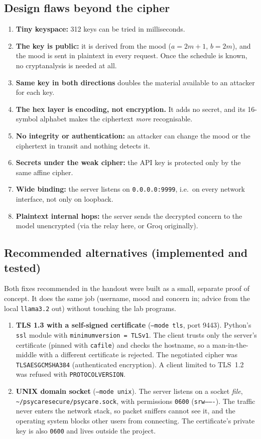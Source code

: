 \documentclass[11pt,a4paper]{article}
\DeclareRobustCommand{\_}{\textunderscore\allowbreak}  %
\newcommand{\ct}[1]{\texttt{#1}}
\begin{document}
\subsection{Design flaws beyond the cipher}
\begin{enumerate}
\item \textbf{Tiny keyspace:} 312 keys can be tried in milliseconds.
\item \textbf{The key is public:} it is derived from the mood ($a=2m+1$, $b=2m$), and the mood is sent in plaintext
      in every request. Once the schedule is known, no cryptanalysis is needed at all.
\item \textbf{Same key in both directions} doubles the material available to an attacker for each key.
\item \textbf{The hex layer is encoding, not encryption.} It adds no secret, and its 16-symbol alphabet makes the
      ciphertext \emph{more} recognisable.
\item \textbf{No integrity or authentication:} an attacker can change the mood or the ciphertext in transit and
      nothing detects it.
\item \textbf{Secrets under the weak cipher:} the API key is protected only by the same affine cipher.
\item \textbf{Wide binding:} the server listens on \ct{0.0.0.0:9999}, i.e.\ on every network interface, not only on
      loopback.
\item \textbf{Plaintext internal hops:} the server sends the decrypted concern to the model unencrypted (via the relay
      here, or Groq originally).
\end{enumerate}

\subsection{Recommended alternatives (implemented and tested)}
\label{sec:fixes}
Both fixes recommended in the handout were built as a small, separate proof of concept. It does
the same job (username, mood and concern in; advice from the local \ct{llama3.2} out) without touching the lab
programs.

\begin{enumerate}
\item \textbf{TLS 1.3 with a self-signed certificate} (\ct{--mode tls}, port 9443). Python's \ct{ssl} module with
      \ct{minimum\_version = TLSv1\_3}. The client trusts only the server's certificate (pinned with \ct{cafile}) and
      checks the hostname, so a man-in-the-middle with a different certificate is rejected. The negotiated cipher was
      \ct{TLS\_AES\_256\_GCM\_SHA384} (authenticated encryption). A client limited to TLS~1.2 was refused with
      \ct{PROTOCOL\_VERSION}.
\item \textbf{UNIX domain socket} (\ct{--mode unix}). The server listens on a socket \emph{file},
      \ct{\textasciitilde/psycare\_secure/psycare.sock}, with permissions \ct{0600} (\ct{srw-------}). The traffic
      never enters the network stack, so packet sniffers cannot see it, and the operating system blocks other users
      from connecting. The certificate's private key is also \ct{0600} and lives outside the project.
\end{enumerate}
\end{document}
